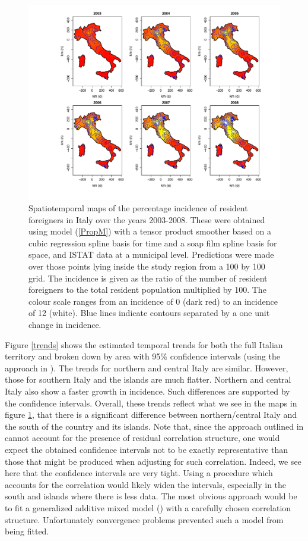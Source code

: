 \begin{figure}[t]
	\centering
		\includegraphics[width=\textwidth]{it/maps-Soap.pdf}
	\caption{Spatiotemporal maps of the percentage incidence of resident foreigners in Italy over the years 2003-2008. These were obtained using model (\ref{PropM}) with a tensor product smoother based on a cubic regression spline basis for time and a soap film spline basis for space, and ISTAT data at a municipal level. Predictions were made over those points lying inside the study region from a 100 by 100 grid. The incidence is given as the ratio of the number of resident foreigners to the total resident population multiplied by 100. The colour scale ranges from an incidence of 0 (dark red) to an incidence of 12 (white). Blue lines indicate contours separated by a one unit change in incidence.}
	\label{it-fig1}
\end{figure}

Figure \ref{trends} shows the estimated temporal trends for both the full Italian territory and broken down by area with 95\% confidence intervals (using the approach in ). The trends for northern and central Italy are similar. However, those for southern Italy and the islands are much flatter. Northern and central Italy also show a faster growth in incidence. Such differences are supported by the confidence intervals. Overall, these trends reflect what we see in the maps in figure \ref{it-fig1}, that there is a significant difference between northern/central Italy and the south of the country and its islands. Note that, since the approach outlined in  cannot account for the presence of residual correlation structure, one would expect the obtained confidence intervals not to be exactly representative than those that might be produced when adjusting for such correlation. \label{cor-r27}Indeed, we see here that the confidence intervals are very tight. Using a procedure which accounts for the correlation would likely widen the intervals, especially in the south and islands where there is less data. The most obvious approach would be to fit a generalized additive mixed model (\cite[chapter 6]{simonbook}) with a carefully chosen correlation structure. Unfortunately convergence problems prevented such a model from being fitted.

